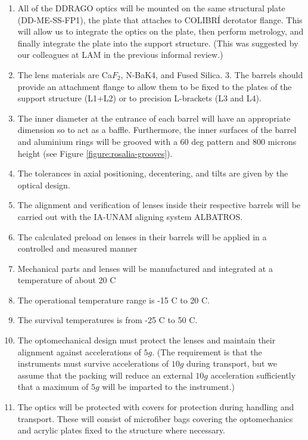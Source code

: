 \documentclass{report}
\begin{document}
\begin{enumerate}
\item All of the DDRAGO optics will be mounted on the same structural plate (DD-ME-SS-FP1), the plate that attaches to COLIBRÍ derotator flange. This will allow us to integrate the optics on the plate, then perform metrology, and finally integrate the plate into the support structure. (This was suggested by our colleagues at LAM in the previous informal review.)
\item The lens materials are Ca$F_2$, N-BaK4, and Fused Silica.
3. The barrels should provide an attachment flange to allow them to be fixed to the plates of the support structure (L1+L2) or to precision L-brackets (L3 and L4).
\item The inner diameter at the entrance of each barrel will have an appropriate dimension so to act as a baffle. Furthermore, the inner surfaces of the barrel and aluminium rings will be grooved with a 60 deg pattern and 800 microns height (see Figure \ref{figure:rosalia-grooves}).
\item The tolerances in axial positioning, decentering, and tilts are given by the optical design.
\item The alignment and verification of lenses inside their respective barrels will be carried out with the IA-UNAM aligning system ALBATROS.
\item The calculated preload on lenses in their barrels will be applied in a controlled and measured manner 
\item Mechanical parts and lenses will be manufactured and integrated at a temperature of about 20 C
\item The operational temperature range is -15 C to 20 C.
\item The survival temperatures is from -25 C to 50 C.
\item The optomechanical design must protect the lenses and maintain their alignment against accelerations of $5g$. (The requirement is that the instruments must survive accelerations of $10g$ during transport, but we assume that the packing will reduce an external $10g$ acceleration sufficiently that a maximum of $5g$ will be imparted to the instrument.)
\item The optics will be protected with covers for protection during handling and transport. These will consist of microfiber bags covering the optomechanics and acrylic plates fixed to the structure where necessary.
\end{enumerate}
\end{document}
